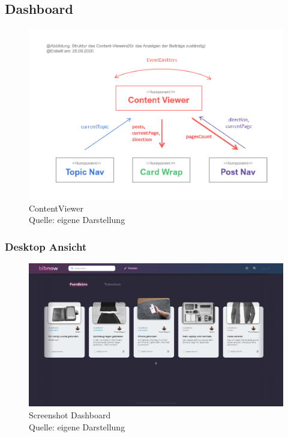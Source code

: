 \documentclass[12pt,titlepage]{article}
\begin{document}
\FloatBarrier

\subsection{Dashboard}

\begin{figure}[hbt!]
\centering
\includegraphics[]{abbildungen/Abbildung_ContentViewer.png}
\caption[ContentViewer]{ContentViewer \\Quelle: eigene Darstellung}
\end{figure}

\FloatBarrier

\subsubsection{Desktop Ansicht}

\begin{figure}[hbt!]
\centering
\includegraphics[width=400pt]{screenshots/Screenshot_Desktop_Dashboard.png}
\caption[Sreenshot Dashboard]{Screenshot Dashboard \\Quelle: eigene Darstellung}
\end{figure}
\end{document}
